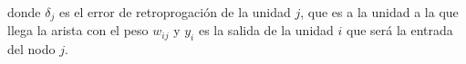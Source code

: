 donde $\delta_j$ es el error de retroprogación de la unidad $j$, que es
a la unidad a la que llega la arista con el peso $w_{ij}$ y $y_i$ 
es la salida de la unidad $i$ que será la entrada del nodo $j$.












